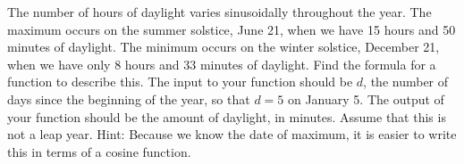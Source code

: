 \begin{exercises}
\item The number of hours of daylight varies sinusoidally throughout the year.  The
    maximum occurs on the summer solstice, June 21, when we have 15 hours and 50 minutes
    of daylight.  The minimum occurs on the winter solstice, December 21, when we have
    only 8 hours and 33 minutes of daylight.  Find the formula for a function to describe
    this.  The input to your function should be $d$, the number of days since the
    beginning of the year, so that $d = 5$ on January 5.  The output of your function
    should be the amount of daylight, in minutes.  Assume that this is not a leap year.
    Hint:  Because we know the date of maximum, it is easier to write this in terms of a
    cosine function.

\begin{exerciseSolution}
\end{exerciseSolution}



\end{exercises}
\afterexercises
